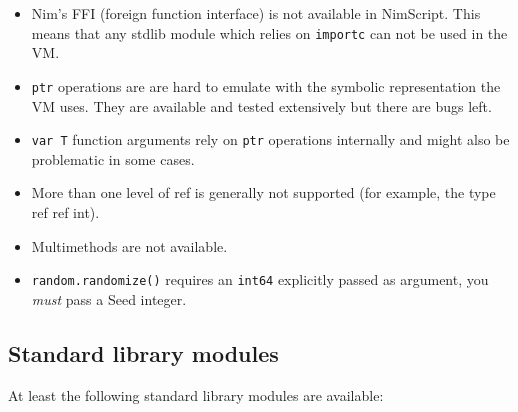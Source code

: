 \begin{itemize}
\tightlist
\item
  Nim's FFI (foreign function interface) is not available in NimScript.
  This means that any stdlib module which relies on \texttt{importc} can
  not be used in the VM.
\item
  \texttt{ptr} operations are are hard to emulate with the symbolic
  representation the VM uses. They are available and tested extensively
  but there are bugs left.
\item
  \texttt{var\ T} function arguments rely on \texttt{ptr} operations
  internally and might also be problematic in some cases.
\item
  More than one level of {ref} is generally not supported (for example,
  the type {ref ref int}).
\item
  Multimethods are not available.
\item
  \texttt{random.randomize()} requires an \texttt{int64} explicitly
  passed as argument, you \emph{must} pass a Seed integer.
\end{itemize}

\hypertarget{standard-library-modules}{%
\subsection{Standard library modules}\label{standard-library-modules}}

At least the following standard library modules are available:

